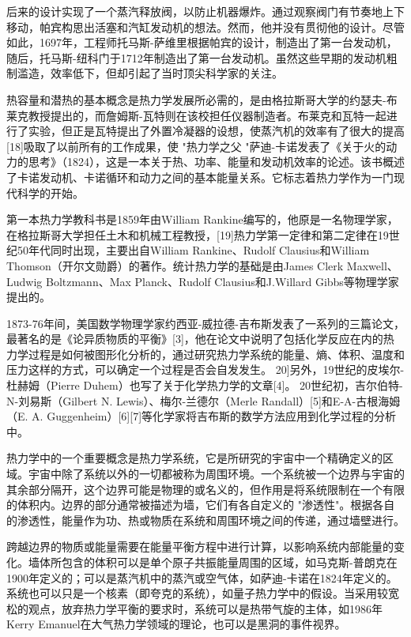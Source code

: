 后来的设计实现了一个蒸汽释放阀，以防止机器爆炸。通过观察阀门有节奏地上下移动，帕宾构思出活塞和汽缸发动机的想法。然而，他并没有贯彻他的设计。尽管如此，1697年，工程师托马斯-萨维里根据帕宾的设计，制造出了第一台发动机，随后，托马斯-纽科门于1712年制造出了第一台发动机。虽然这些早期的发动机粗制滥造，效率低下，但却引起了当时顶尖科学家的关注。

热容量和潜热的基本概念是热力学发展所必需的，是由格拉斯哥大学的约瑟夫-布莱克教授提出的，而詹姆斯-瓦特则在该校担任仪器制造者。布莱克和瓦特一起进行了实验，但正是瓦特提出了外置冷凝器的设想，使蒸汽机的效率有了很大的提高[18]吸取了以前所有的工作成果，使 "热力学之父 "萨迪-卡诺发表了《关于火的动力的思考》（1824），这是一本关于热、功率、能量和发动机效率的论述。该书概述了卡诺发动机、卡诺循环和动力之间的基本能量关系。它标志着热力学作为一门现代科学的开始。

第一本热力学教科书是1859年由William Rankine编写的，他原是一名物理学家，在格拉斯哥大学担任土木和机械工程教授，[19]热力学第一定律和第二定律在19世纪50年代同时出现，主要出自William Rankine、Rudolf Clausius和William Thomson（开尔文勋爵）的著作。统计热力学的基础是由James Clerk Maxwell、Ludwig Boltzmann、Max Planck、Rudolf Clausius和J.Willard Gibbs等物理学家提出的。

1873-76年间，美国数学物理学家约西亚-威拉德-吉布斯发表了一系列的三篇论文，最著名的是《论异质物质的平衡》[3]，他在论文中说明了包括化学反应在内的热力学过程是如何被图形化分析的，通过研究热力学系统的能量、熵、体积、温度和压力这样的方式，可以确定一个过程是否会自发发生。 20]另外，19世纪的皮埃尔-杜赫姆（Pierre Duhem）也写了关于化学热力学的文章[4]。 20世纪初，吉尔伯特-N-刘易斯（Gilbert N. Lewis）、梅尔-兰德尔（Merle Randall）[5]和E-A-古根海姆（E. A. Guggenheim）[6][7]等化学家将吉布斯的数学方法应用到化学过程的分析中。

热力学中的一个重要概念是热力学系统，它是所研究的宇宙中一个精确定义的区域。宇宙中除了系统以外的一切都被称为周围环境。一个系统被一个边界与宇宙的其余部分隔开，这个边界可能是物理的或名义的，但作用是将系统限制在一个有限的体积内。边界的部分通常被描述为墙，它们有各自定义的 "渗透性"。根据各自的渗透性，能量作为功、热或物质在系统和周围环境之间的传递，通过墙壁进行。

跨越边界的物质或能量需要在能量平衡方程中进行计算，以影响系统内部能量的变化。墙体所包含的体积可以是单个原子共振能量周围的区域，如马克斯-普朗克在1900年定义的；可以是蒸汽机中的蒸汽或空气体，如萨迪-卡诺在1824年定义的。系统也可以只是一个核素（即夸克的系统），如量子热力学中的假设。当采用较宽松的观点，放弃热力学平衡的要求时，系统可以是热带气旋的主体，如1986年Kerry Emanuel在大气热力学领域的理论，也可以是黑洞的事件视界。


